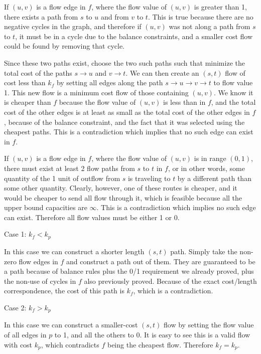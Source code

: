 \documentclass{article}
\begin{document}
If $(u,v)$ is a flow edge in $f$, where the flow value of $(u,v)$ is greater than 1,
there exists a path from $s$ to $u$ and from $v$ to $t$. This is true because
there are no negative cycles in the graph, and therefore if $(u,v)$ was not
along a path from $s$ to $t$, it must be in a cycle due to the balance
constraints, and a smaller cost flow could be found by removing that cycle.

Since these two paths exist, choose the two such paths such that minimize the
total cost of the paths $s \to u$ and $v \to t$. We can then create an $(s,t)$
flow of cost less than $k_f$ by setting all edges along the path $s \to u \to
v \to t$ to flow value 1. This new flow is a minimum cost flow of those containing
$(u,v)$. We know it is cheaper than $f$ because the flow value of $(u,v)$ is
less than in $f$, and the total cost of the other edges is at least as small
as the total cost of the other edges in $f$, because of the balance
constraint, and the fact that it was selected using the cheapest paths. This is a
contradiction which implies that no such edge can exist in $f$.

If $(u,v)$ is a flow edge in $f$, where the flow value of $(u,v)$ is in range
$(0,1)$, there must exist at least 2 flow paths from $s$ to $t$ in $f$, or in other
words, some quantity of the 1 unit of outflow from $s$ is traveling to $t$ by
a different path than some other quantity. Clearly, however, one of these
routes is cheaper, and it would be cheaper to send all flow through it, which
is feasible because all the upper bound capacities are $\infty$. This is a
contradiction which implies no such edge can exist. Therefore all flow values
must be either 1 or 0.

Case 1: $k_f < k_p$

In this case we can construct a shorter length $(s,t)$ path. Simply take the
non-zero flow edges in $f$ and construct a path out of them. They are
guaranteed to be a path because of balance rules plus the 0/1 requirement
we already proved, plus the non-use of cycles in $f$ also previously proved.
Because of the exact cost/length correspondence, the cost of this path is
$k_f$, which is a contradiction.

Case 2: $k_f > k_p$

In this case we can construct a smaller-cost $(s,t)$ flow by setting the flow
value of all edges in $p$ to 1, and all the others to 0. It is easy to see
this is a valid flow with cost $k_p$, which contradicts $f$ being the cheapest
flow. Therefore $k_f = k_p$. 
\end{document}
